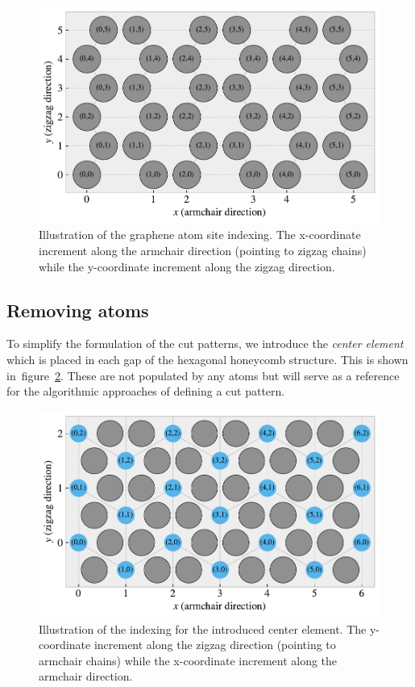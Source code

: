 \begin{figure}[!htb]
  \centering
  \includegraphics[width=0.7\linewidth]{figures/system/atom_indexing.pdf}
  \caption{Illustration of the graphene atom site indexing. The x-coordinate increment along the armchair direction (pointing to zigzag chains) while the y-coordinate increment along the zigzag direction.}
  \label{fig:atom_indexing}
\end{figure}


\subsection{Removing atoms}
To simplify the formulation of the cut patterns, we introduce the \textit{center element} which is placed in each gap of the hexagonal honeycomb structure. This is shown in~figure~\cref{fig:center_indexing}. These are not populated by any atoms but will serve as a reference for the algorithmic approaches of defining a cut pattern.

\begin{figure}[!htb]
  \centering
  \includegraphics[width=0.7\linewidth]{figures/system/center_indexing.pdf}
  \caption{Illustration of the indexing for the introduced center element. The y-coordinate increment along the zigzag direction (pointing to armchair chains) while the x-coordinate increment along the armchair direction.}
  \label{fig:center_indexing}
\end{figure}

